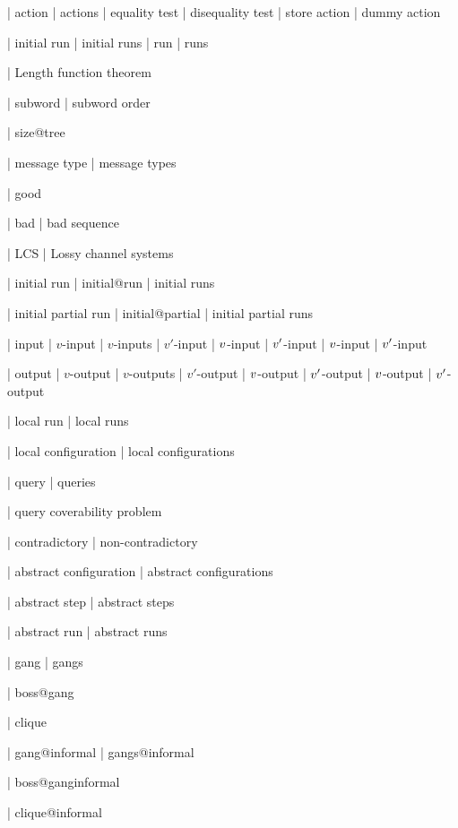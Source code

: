 | action
| actions
| equality test
| disequality test
| store action
| dummy action


| initial run
| initial runs
| run
| runs

| Length function theorem

| subword 
| subword order


| size@tree 

| message type
| message types

| good

| bad
| bad sequence

| LCS 
| Lossy channel systems

| initial run
| initial@run
| initial runs

| initial partial run
| initial@partial
| initial partial runs

| input
| $v$-input
| $v$-inputs
| $v'$-input
| $v$-input
| $v'$-input
| $v$-input
| $v'$-input

| output
| $v$-output
| $v$-outputs
| $v'$-output
| $v$-output
| $v'$-output
| $v$-output
| $v'$-output

| local run
| local runs

| local configuration
| local configurations

| query
| queries

| query coverability problem

| contradictory
| non-contradictory

| abstract configuration
| abstract configurations

| abstract step
| abstract steps


| abstract run
| abstract runs


| gang
| gangs

| boss@gang

| clique

| gang@informal
| gangs@informal

| boss@ganginformal

| clique@informal


